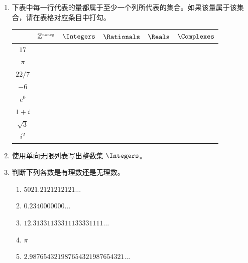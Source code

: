 \begin{enumerate}

  \item 下表中每一行代表的量都属于至少一个列所代表的集合。如果该量属于该集合，请在表格对应条目中打勾。
  
  \begin{tabular}{|c||c|c|c|c|c|} \hline
   & ${\mathbb Z}^{\mbox{\tiny noneg}}$ & $\Integers$ & $\Rationals$ & $\Reals$ & $\Complexes$
   \\ \hline\hline
  \rule{0pt}{15pt} $17$ & & & & & \\ \hline
  \rule{0pt}{15pt} $\pi$ & & & & & \\ \hline
  \rule{0pt}{15pt} $22/7$ & & & & & \\ \hline
  \rule{0pt}{15pt} $-6$ & & & & & \\ \hline
  \rule{0pt}{15pt} $e^0$ & & & & & \\ \hline
  \rule{0pt}{15pt} $1+i$ & & & & & \\ \hline
  \rule{0pt}{15pt} $\sqrt{3}$ & & & & & \\ \hline
  \rule{0pt}{15pt} $i^2$ & & & & & \\  \hline
  \end{tabular}
  
  
  \vfill
  
  \hintspagebreak
  \workbookpagebreak
  
  \item 使用单向无限列表写出整数集 $\Integers$。
  \twsvspace{.25in}{1in}{.15in}
  
  
  \vfill
  
  
  \item 判断下列各数是有理数还是无理数。
  \begin{enumerate}
  \item $5021.2121212121\ldots$
  \item $0.2340000000\ldots$
  \item $12.31331133311133331111\ldots$
  \item $\pi$
  \item $2.987654321987654321987654321\ldots$
  \end{enumerate}
  
  \vfill
  

\end{enumerate}
